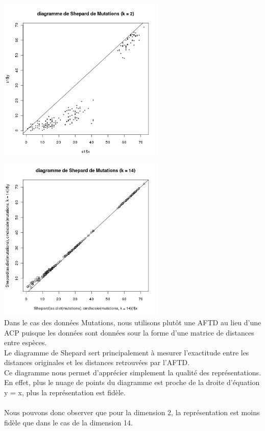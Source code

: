 \documentclass[a4paper, 10pt]{article}
\begin{document}
\includegraphics[height = 8cm, width = 8cm]{plots/plot_shepard_1.png}
\includegraphics[height = 8cm, width = 8cm]{plots/plot_shepard_2.png}\\
Dans le cas des donn\'ees Mutations, nous utilisons plut\^ot une AFTD au lieu d'une ACP puisque
les donn\'ees sont donn\'ees sour la forme d'une matrice de distances entre esp\`eces.\\
Le diagramme de Shepard sert principalement \`a mesurer l'exactitude entre les distances originales et les distances retrouv\'ees par l'AFTD.\\
Ce diagramme nous permet d'appr\'ecier simplement la qualit\'e des repr\'esentations.
En effet, plus le nuage de points du diagramme est proche de la droite d'\'equation y = x, plus la repr\'esentation est fid\`ele.\\ \\
Nous pouvons donc observer que pour la dimension 2, la repr\'esentation est moins fid\`ele que dans le cas de la dimension 14.\\ \\
\end{document}
